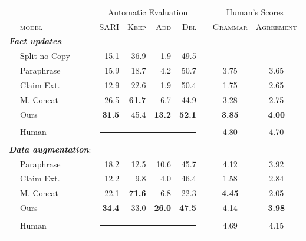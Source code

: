 \documentclass[letterpaper]{article} %
\begin{document}
\begin{table}[t]
\small
\centering
\begin{tabular}{llrrrrccc}
\toprule
& & \multicolumn{4}{c}{Automatic Evaluation} & & \multicolumn{2}{c}{Human's Scores}\\
\cmidrule(lr){3-6}\cmidrule(lr){8-9}
&\textsc{model}              & \textsc{SARI} & \textsc{Keep} & \textsc{Add} & \textsc{Del} & & \textsc{Grammar} & \textsc{Agreement} \\
\midrule
\multicolumn{2}{l}{\textit{\textbf{Fact updates}}:} &\\
&Split-no-Copy & 15.1 & 36.9 & 1.9 & 49.5 && - & -\\
&Paraphrase & 15.9 & 18.7 & 4.2 & 50.7 & & 3.75 & 3.65 \\
&Claim Ext.    & 12.9 & 22.6       & 1.9      & 50.4 & & 1.75 & 2.65     \\
&M. Concat     & 26.5 & \textbf{61.7}      & 6.7      & 44.9  & & 3.28 & 2.75 \\
&Ours & \textbf{31.5} & 45.4      & \textbf{13.2}      & \textbf{52.1}  & & \textbf{3.85} & \textbf{4.00} \\
&Human &\multicolumn{4}{r}{\rule[0.09cm]{4cm}{0.01cm}} & & 4.80 & 4.70 \\
\midrule

\multicolumn{2}{l}{\textit{\textbf{Data augmentation}}:} &\\
&Paraphrase & 18.2 & 12.5 & 10.6 & 45.7 & & 4.12 & 3.92 \\
&Claim Ext.    & 12.2 & 9.8       & 4.0      & 46.4  & & 1.58 & 2.84    \\
&M. Concat     & 22.1 & \textbf{71.6}      & 6.8      & 22.3  & & \textbf{4.45} & 2.05  \\
&Ours               & \textbf{34.4} & 33.0      & \textbf{26.0}     & \textbf{47.5}   & & 4.14 & \textbf{3.98}  \\
&Human &\multicolumn{4}{r}{\rule[0.09cm]{4cm}{0.01cm}} & & 4.69 & 4.15 \\



\end{tabular}
\end{table}
\end{document}
